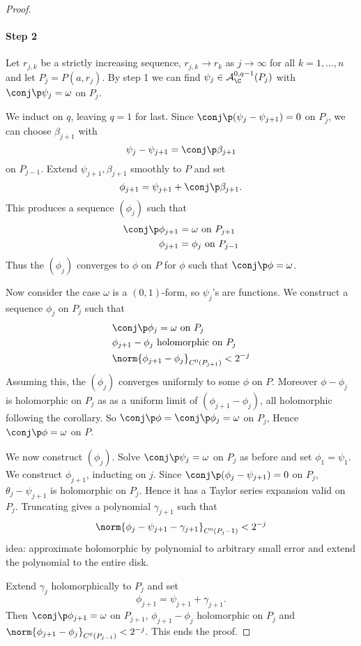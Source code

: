 \documentclass[a4paper]{article}
\begin{document}
\begin{proof}
  \paragraph{Step 2}
  Let \(r_{j, k}\) be a strictly increasing sequence, \(r_{j, k} \to r_k\) as \(j \to \infty\) for all \(k = 1, \dots, n\) and let \(P_j = P(a, r_j)\). By step 1 we can find \(\psi_j \in \mathcal A_\C^{0, q - 1}(P_j)\) with \(\conj \p \psi_j = \omega\) on \(P_j\).

  We induct on \(q\), leaving \(q = 1\) for last. Since \(\conj \p(\psi_j - \psi_{j + 1}) = 0\) on \(P_j\), we can choose \(\beta_{j + 1}\) with
  \[
    \psi_j - \psi_{j + 1} = \conj \p \beta_{j + 1}
  \]
  on \(P_{j - 1}\). Extend \(\psi_{j + 1}, \beta_{j + 1}\) smoothly to \(P\) and set
  \[
    \phi_{j + 1} = \psi_{j + 1} + \conj \p \beta_{j + 1}.
  \]
  This produces a sequence \((\phi_j)\) such that
  \begin{align*}
    \conj \p \phi_{j + 1} &= \omega \text{ on } P_{j + 1} \\
    \phi_{j + 1} &= \phi_j \text{ on } P_{j - 1}
  \end{align*}
  Thus the \((\phi_j)\) converges to \(\phi\) on \(P\) for \(\phi\) such that \(\conj \p \phi = \omega\).

  Now consider the case \(\omega\) is a \((0, 1)\)-form, so \(\psi_j\)'s are functions. We construct a sequence \(\phi_j\) on \(P_j\) such that
  \begin{align*}
    &\conj \p \phi_j = \omega \text{ on } P_j \\
    &\phi_{j + 1} - \phi_j \text{ holomorphic on } P_j \\
    &\norm{\phi_{j + 1} - \phi_j}_{C^0(P_{j + 1})} < 2^{-j}
  \end{align*}
  Assuming this, the \((\phi_j)\) converges uniformly to some \(\phi\) on \(P\). Moreover \(\phi - \phi_j\) is holomorphic on \(P_j\) as as a uniform limit of \((\phi_{j + 1} - \phi_j)\), all holomorphic following the corollary. So \(\conj \p \phi = \conj \p \phi_j = \omega\) on \(P_j\), Hence \(\conj \p \phi = \omega\) on \(P\).

  We now construct \((\phi_j)\). Solve \(\conj \p \psi_j = \omega\) on \(P_j\) as before and set \(\phi_1 = \psi_1\). We construct \(\phi_{j + 1}\), inducting on \(j\). Since \(\conj \p(\phi_j - \psi_{j + 1}) = 0\) on \(P_j\), \(\theta_j - \psi_{j + 1}\) is holomorphic on \(P_j\). Hence it has a Taylor series expansion valid on \(P_j\). Truncating gives a polynomial \(\gamma_{j + 1}\) such that
  \[
    \norm{\phi_j - \psi_{j + 1} - \gamma_{j + 1}}_{C^0(P_j - 1)} < 2^{-j}
  \]
  idea: approximate holomorphic by polynomial to arbitrary small error and extend the polynomial to the entire disk.

  Extend \(\gamma_j\) holomorphically to \(P_j\) and set
  \[
    \phi_{j + 1} = \psi_{j + 1} + \gamma_{j + 1}.
  \]
  Then \(\conj \p \phi_{j + 1} = \omega\) on \(P_{j + 1}\), \(\phi_{j + 1} - \phi_j\) holomorphic on \(P_j\) and \(\norm{\phi_{j + 1} - \phi_j}_{C^0(P_{j - 1})} < 2^{-j}\). This ends the proof.
\end{proof}
\end{document}
